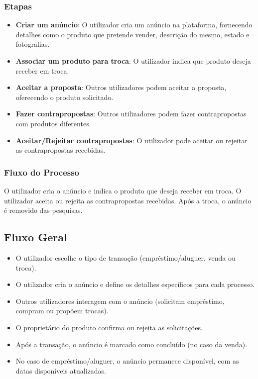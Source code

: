 \documentclass[a4paper, 12pt]{article} %
\begin{document}
\subsubsection{Etapas}
\begin{itemize}
	\item \textbf{Criar um anúncio}: O utilizador cria um anúncio na plataforma, fornecendo detalhes como o produto que pretende vender, descrição do mesmo, estado e fotografias.
	\item \textbf{Associar um produto para troca}: O utilizador indica que produto deseja receber em troca.
	\item \textbf{Aceitar a proposta}: Outros utilizadores podem aceitar a proposta, oferecendo o produto solicitado.
	\item \textbf{Fazer contrapropostas}: Outros utilizadores podem fazer contrapropostas com produtos diferentes.
	\item \textbf{Aceitar/Rejeitar contrapropostas}: O utilizador pode aceitar ou rejeitar as contrapropostas recebidas.
\end{itemize}

\subsubsection{Fluxo do Processo}
O utilizador cria o anúncio e indica o produto que deseja receber em troca. O utilizador aceita ou rejeita as contrapropostas recebidas. Após a troca, o anúncio é removido das pesquisas.

\subsection{Fluxo Geral}
\begin{itemize}
	\item O utilizador escolhe o tipo de transação (empréstimo/aluguer, venda ou troca).
	\item O utilizador cria o anúncio e define os detalhes específicos para cada processo.
	\item Outros utilizadores interagem com o anúncio (solicitam empréstimo, compram ou propõem trocas).
	\item O proprietário do produto confirma ou rejeita as solicitações.
	\item Após a transação, o anúncio é marcado como concluído (no caso da venda).
	\item No caso de empréstimo/aluguer, o anúncio permanece disponível, com as datas disponíveis atualizadas.
\end{itemize}
\end{document}
